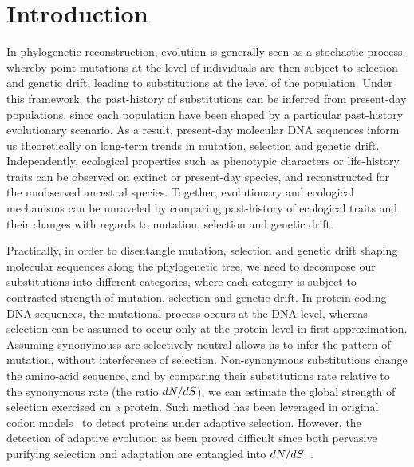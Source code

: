 \section{Introduction}
\label{sec:Introduction}

In phylogenetic reconstruction, evolution is generally seen as a stochastic process, whereby point mutations at the level of individuals are then subject to selection and genetic drift, leading to \glspl{substitution} at the level of the population.
Under this framework, the past-history of \glspl{substitution} can be inferred from present-day populations, since each population have been shaped by a particular past-history evolutionary scenario.
As a result, present-day molecular \acrshort{DNA} sequences inform us theoretically on long-term trends in mutation, selection and genetic drift.
Independently, ecological properties such as phenotypic characters or life-history traits can be observed on extinct or present-day species, and reconstructed for the unobserved ancestral species.
Together, evolutionary and ecological mechanisms can be unraveled by comparing past-history of ecological traits and their changes with regards to mutation, selection and genetic drift.

Practically, in order to disentangle mutation, selection and genetic drift shaping molecular sequences along the phylogenetic tree, we need to decompose our \glspl{substitution} into different categories, where each category is subject to contrasted strength of mutation, selection and genetic drift.
In protein coding \acrshort{DNA} sequences, the mutational process occurs at the \acrshort{DNA} level, whereas selection can be assumed to occur only at the protein level in first approximation.
Assuming \glspl{synonymous} are selectively \gls{neutral} allows us to infer the pattern of mutation, without interference of selection.
Non-synonymous \glspl{substitution} change the amino-acid sequence, and by comparing their \glspl{substitution} rate relative to the \gls{synonymous} rate (the ratio $dN/dS$), we can estimate the global strength of selection exercised on a protein.
Such method has been leveraged in original \gls{codon} models~\citep{Muse1994,Goldman1994} to detect proteins under adaptive selection.
However, the detection of adaptive evolution as been proved difficult since both pervasive purifying selection and adaptation are entangled into $dN/dS$~\citep{Yang2000}.

